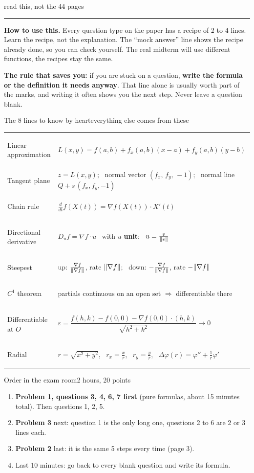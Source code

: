 \documentclass[11pt]{article}
\newcommand{\grad}{\nabla}
\newcommand{\head}[2]{\par\medskip{\mont\bfseries\Large\color{tealDD}#1}\hfill{\mont\small\color{coralD}#2}\par
  {\color{coral}\rule{\linewidth}{1.2pt}}\par\smallskip}
\begin{document}
\head{AMATH301 Midterm: Just the Recipes}{read this, not the 44 pages}

\textbf{How to use this.} Every question type on the paper has a recipe of 2 to 4 lines. Learn the
recipe, not the explanation. The ``mock answer'' line shows the recipe already done, so you can check
yourself. The real midterm will use different functions, the recipes stay the same.

\begin{key}
\textbf{\mont The rule that saves you:} if you are stuck on a question, \textbf{write the formula
or the definition it needs anyway}. That line alone is usually worth part of the marks, and writing it
often shows you the next step. Never leave a question blank.
\end{key}

\begin{card}{The 8 lines to know by heart}{everything else comes from these}
\renewcommand{\arraystretch}{1.45}
\begin{tabularx}{\linewidth}{@{}>{\bfseries\raggedright\arraybackslash}p{3.9cm}X@{}}
Linear approximation & $L(x,y)=f(a,b)+f_x(a,b)(x-a)+f_y(a,b)(y-b)$\\
Tangent plane & $z=L(x,y)$; \ normal vector $(f_x,\,f_y,\,-1)$; \ normal line $Q+s\,(f_x,f_y,-1)$\\
Chain rule & $\frac{d}{dt}f(X(t))=\grad f(X(t))\cdot X'(t)$\\
Directional derivative & $D_uf=\grad f\cdot u$ \ with $u$ \textbf{unit}: \ $u=\frac{v}{\lVert v\rVert}$\\
Steepest & up: $\frac{\grad f}{\norm{\grad f}}$, rate $\norm{\grad f}$; \ down: $-\frac{\grad f}{\norm{\grad f}}$, rate $-\norm{\grad f}$\\
$C^1$ theorem & partials continuous on an open set $\Rightarrow$ differentiable there\\
Differentiable at $O$ & $\varepsilon=\dfrac{f(h,k)-f(0,0)-\grad f(0,0)\cdot(h,k)}{\sqrt{h^2+k^2}}\to0$\\
Radial & $r=\sqrt{x^2+y^2}$, \ $r_x=\frac xr$, \ $r_y=\frac yr$, \ $\Delta\varphi(r)=\varphi''+\frac1r\varphi'$
\end{tabularx}
\end{card}

\begin{card}{Order in the exam room}{2 hours, 20 points}
\begin{enumerate}
  \item \textbf{Problem 1, questions 3, 4, 6, 7 first} (pure formulas, about 15 minutes total).
        Then questions 1, 2, 5.
  \item \textbf{Problem 3} next: question 1 is the only long one, questions 2 to 6 are 2 or 3 lines each.
  \item \textbf{Problem 2} last: it is the same 5 steps every time (page 3).
  \item Last 10 minutes: go back to every blank question and write its formula.
\end{enumerate}
\end{card}
\end{document}
